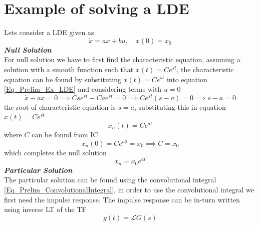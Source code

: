 \section{Example of solving a LDE} \label{Sec_Prelim_LDE_Ex}

Lets consider a LDE given as
\begin{equation} \label{Eq_Prelim_Ex_LDE}
	\dot{x} = a x + b u, \quad x(0) = x_0
\end{equation}
\textbf{\textit{Null Solution}} \\
For null solution we have to first find the characteristic equation, assuming a solution with a smooth function such that $x(t) = C e^{st}$, the characteristic equation can be found by substituting $x(t) = C e^{st}$ into equation \eqref{Eq_Prelim_Ex_LDE} and considering terms with $u = 0$
\begin{equation}
	\dot{x} - ax = 0 \implies C s e^{st} - C a e^{st} = 0 \implies C e^{st} (s - a) = 0 \implies s - a = 0
\end{equation}
the root of characteristic equation is $s = a$, substituting this in equation $x(t) = C e^{st}$
\begin{equation}
	x_{n}(t) = C e^{at}
\end{equation}
where $C$ can be found from IC
\begin{equation}
	x_{n}(0) = C e^{a 0} = x_0 \implies C = x_0
\end{equation}
which completes the null solution
\begin{equation} \label{Eq_Prelim_LDE_Ex_NullSolution}
	x_{n} = x_0 e^{at}
\end{equation}
\textbf{\textit{Particular Solution}} \\
The particular solution can be found using the convolutional integral \eqref{Eq_Prelim_ConvolutionalIntegral}, in order to use the convolutional integral we first need the impulse response. The impulse response can be in-turn written using inverse LT of the TF
\begin{equation*}
	g(t) = \mathcal{L}{G(s)}
\end{equation*}

